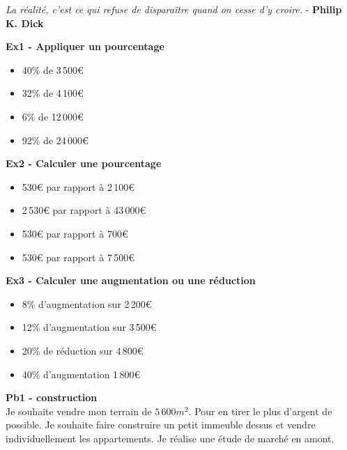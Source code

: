



\begin{center}
  \textit{La réalité, c'est ce qui refuse de disparaître quand on cesse d'y croire.}  - \textbf{Philip K. Dick}
\end{center}

\begin{multicols}{3}\noindent
  \textbf{Ex1 - Appliquer un pourcentage}\\

  \begin{itemize}[label={$\bullet$}]
    \item 40\% de 3\,500€
    \item 32\% de 4\,100€
    \item 6\% de 12\,000€
    \item 92\% de 24\,000€
  \end{itemize}

  \textbf{Ex2 - Calculer une pourcentage}\\

  \begin{itemize}[label={$\bullet$}]
    \item 530€ par rapport à 2\,100€
    \item 2\,530€ par rapport à 43\,000€
    \item 530€ par rapport à 700€
    \item 530€ par rapport à 7\,500€
  \end{itemize}

\textbf{Ex3 - Calculer une augmentation ou une réduction}\\


\begin{itemize}[label={$\bullet$}]
  \item  8\% d'augmentation sur 2\,200€
  \item 12\% d'augmentation sur 3\,500€
  \item 20\% de réduction sur 4\,800€
  \item 40\% d'augmentation 1\,800€
\end{itemize}
\end{multicols}

\textbf{Pb1 - construction}\\

Je souhaite vendre mon terrain de $5\,600m^2$. Pour en tirer le plus d'argent de possible. Je souhaite faire construire un petit immeuble dessus et vendre individuellement les appartements. Je réalise une étude de marché en amont. 

